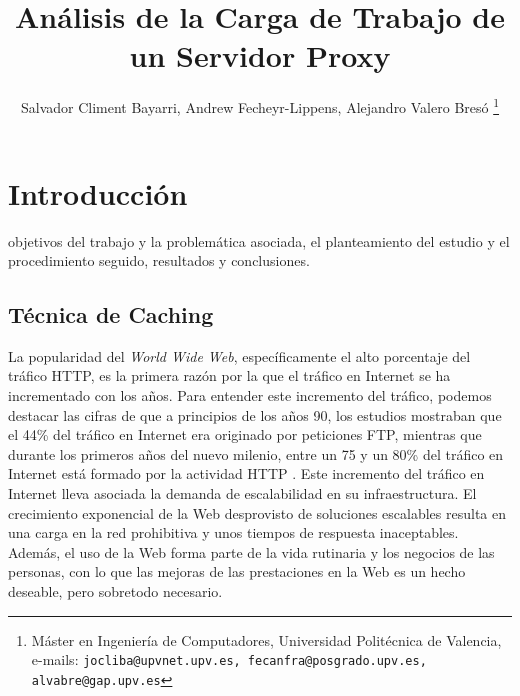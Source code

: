 \documentclass[twocolumn]{Jornadas}
\begin{document}
\title{Análisis de la Carga de Trabajo de un Servidor Proxy}

\author{%
     Salvador Climent Bayarri, %
     Andrew Fecheyr-Lippens, %
     Alejandro Valero Bresó%
	\thanks{Máster en Ingeniería de Computadores, Universidad Politécnica de Valencia, e-mails: {\tt jocliba@upvnet.upv.es, fecanfra@posgrado.upv.es, alvabre@gap.upv.es}}
     }

\maketitle
\markboth{}{}
\pagestyle{empty}
\thispagestyle{empty} %

\begin{abstract}

\end{abstract}

\begin{keywords}

\end{keywords}

\section{Introducción}
\label{intro}

 objetivos del trabajo y la problemática asociada, el planteamiento
del estudio y el procedimiento seguido, resultados y conclusiones.

\subsection{Técnica de Caching}

La popularidad del \emph{World Wide Web}, específicamente el alto porcentaje del tráfico HTTP, es la primera razón por la que el tráfico en Internet se ha incrementado con los años. Para entender este incremento del tráfico, podemos destacar las cifras de que a principios de los años 90, los estudios mostraban que el 44\% del tráfico en Internet era originado por peticiones FTP, mientras que durante los primeros años del nuevo milenio, entre un 75 y un 80\% del tráfico en Internet está formado por la actividad HTTP \cite{barish}. Este incremento del tráfico en Internet lleva asociada la demanda de escalabilidad en su infraestructura. El crecimiento exponencial de la Web desprovisto de soluciones escalables resulta en una carga en la red prohibitiva y unos tiempos de respuesta inaceptables. Además, el uso de la Web forma parte de la vida rutinaria y los negocios de las personas, con lo que las mejoras de las prestaciones en la Web es un hecho deseable, pero sobretodo necesario.
\end{document}
